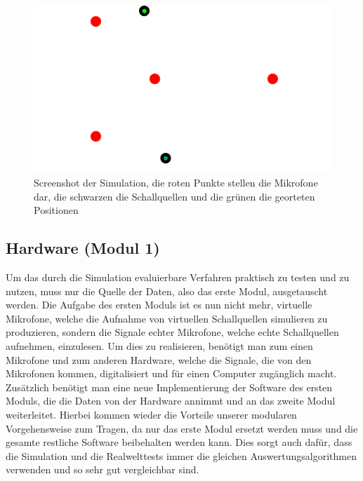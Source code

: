 \begin{figure}[H]
  \includegraphics[width=\linewidth]{img/bildsimulation}
  \caption{Screenshot der Simulation, die roten Punkte stellen die Mikrofone dar, die schwarzen die Schallquellen und die grünen die georteten Positionen}
\end{figure}

\subsection{Hardware (Modul 1)}
Um das durch die Simulation evaluierbare Verfahren praktisch zu testen und zu nutzen, muss nur die Quelle der Daten, also das erste Modul, ausgetauscht werden. Die Aufgabe des ersten Moduls ist es nun nicht mehr, virtuelle Mikrofone, welche die Aufnahme von virtuellen Schallquellen simulieren zu produzieren, sondern die Signale echter Mikrofone, welche echte Schallquellen aufnehmen, einzulesen. Um dies zu realisieren, benötigt man zum einen Mikrofone und zum anderen Hardware, welche die Signale, die von den Mikrofonen kommen, digitalisiert und für einen Computer zugänglich macht. Zusätzlich benötigt man eine neue Implementierung der Software des ersten Moduls, die die Daten von der Hardware annimmt und an das zweite Modul weiterleitet. Hierbei kommen wieder die Vorteile unserer modularen Vorgehensweise zum Tragen, da nur das erste Modul ersetzt werden muss und die gesamte restliche Software beibehalten werden kann. Dies sorgt auch dafür, dass die Simulation und die Realwelttests immer die gleichen Auswertungsalgorithmen verwenden und so sehr gut vergleichbar sind.

